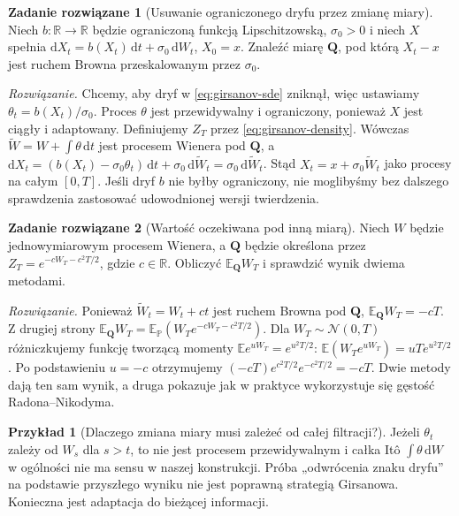\documentclass[11pt,a4paper,oneside]{report}
\numberwithin{equation}{chapter}
\theoremstyle{plain}
\theoremstyle{definition}
\newtheorem{przyklad}{Przykład}[chapter]
\newtheorem{zadanie}{Zadanie rozwiązane}[chapter]
\theoremstyle{remark}
\newcommand{\R}{\mathbb{R}}
\newcommand{\Prob}{\mathbb{P}}
\newcommand{\E}{\mathbb{E}}
\newcommand{\dd}{\mathrm{d}}
\newcommand{\Normal}{\mathcal{N}}
\begin{document}
\begin{zadanie}[Usuwanie ograniczonego dryfu przez zmianę miary]
Niech $b:\R\to\R$ będzie ograniczoną funkcją Lipschitzowską,
$\sigma_0>0$ i niech $X$ spełnia
$\dd X_t=b(X_t)\,\dd t+\sigma_0\,\dd W_t$, $X_0=x$.
Znaleźć miarę $\mathbf Q$, pod którą $X_t-x$
jest ruchem Browna przeskalowanym przez $\sigma_0$.

\emph{Rozwiązanie.} Chcemy, aby dryf w
\eqref{eq:girsanov-sde} zniknął, więc ustawiamy
$\theta_t=b(X_t)/\sigma_0$.
Proces $\theta$ jest przewidywalny i ograniczony,
ponieważ $X$ jest ciągły i adaptowany. Definiujemy
$Z_T$ przez \eqref{eq:girsanov-density}. Wówczas
$\widetilde W=W+\int\theta\,\dd t$ jest procesem
Wienera pod $\mathbf Q$, a
$\dd X_t=(b(X_t)-\sigma_0\theta_t)\,\dd t
+\sigma_0\,\dd\widetilde W_t=\sigma_0\,\dd\widetilde W_t$.
Stąd $X_t=x+\sigma_0\widetilde W_t$ jako procesy
na całym $[0,T]$. Jeśli dryf $b$ nie byłby ograniczony,
nie moglibyśmy bez dalszego sprawdzenia zastosować
udowodnionej wersji twierdzenia.
\end{zadanie}

\begin{zadanie}[Wartość oczekiwana pod inną miarą]
Niech $W$ będzie jednowymiarowym procesem Wienera,
a $\mathbf Q$ będzie określona przez
$Z_T=e^{-cW_T-c^2T/2}$, gdzie $c\in\R$.
Obliczyć $\E_{\mathbf Q}W_T$ i sprawdzić wynik
dwiema metodami.

\emph{Rozwiązanie.} Ponieważ $\widetilde W_t=W_t+ct$
jest ruchem Browna pod $\mathbf Q$,
$\E_{\mathbf Q}W_T=-cT$.
Z drugiej strony
$\E_{\mathbf Q}W_T=\E_{\Prob}(W_Te^{-cW_T-c^2T/2})$.
Dla $W_T\sim\Normal(0,T)$ różniczkujemy funkcję
tworzącą momenty $\E e^{uW_T}=e^{u^2T/2}$:
$\E(W_Te^{uW_T})=uT e^{u^2T/2}$.
Po podstawieniu $u=-c$ otrzymujemy
$(-cT)e^{c^2T/2}e^{-c^2T/2}=-cT$.
Dwie metody dają ten sam wynik, a druga pokazuje
jak w praktyce wykorzystuje się gęstość Radona--Nikodyma.
\end{zadanie}

\begin{przyklad}[Dlaczego zmiana miary musi zależeć od całej filtracji?]
Jeżeli $\theta_t$ zależy od $W_s$ dla $s>t$, to nie
jest procesem przewidywalnym i całka Itô
$\int\theta\,\dd W$ w ogólności nie ma sensu w
naszej konstrukcji. Próba „odwrócenia znaku dryfu”
na podstawie przyszłego wyniku nie jest poprawną
strategią Girsanowa. Konieczna jest adaptacja
do bieżącej informacji.
\end{przyklad}
\end{document}
